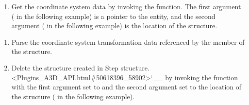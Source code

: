 \documentclass[letterpaper,12pt,english,openany,oneside]{sphinxmanual}
\begin{document}
\begin{sphinxVerbatim}[commandchars=\\\{\}]
 
\end{sphinxVerbatim}
\begin{enumerate}
%
\setcounter{enumi}{2}
\item {} 
Get the coordinate system data by invoking the  function. The first argument ( in the following example) is a pointer to the  entity, and the second argument ( in the following example) is the location of the  structure.

\end{enumerate}

\begin{sphinxVerbatim}[commandchars=\\\{\}]
    
\end{sphinxVerbatim}
\begin{enumerate}
%
\setcounter{enumi}{3}
\item {} 
Parse the coordinate system transformation data referenced by the  member of the  structure.

\item {} 
Delete the  structure created in Step  structure. <Plugins\_A3D\_API.html\#50618396\_58902>`\_\_ by invoking the  function with the first argument set to  and the second argument set to the location of the structure ( in the following example).

\end{enumerate}

\begin{sphinxVerbatim}[commandchars=\\\{\}]
 
\end{sphinxVerbatim}
\end{document}
